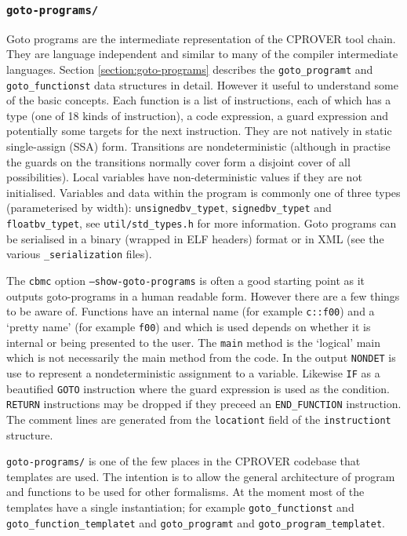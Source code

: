 \documentclass{article}
\newcommand{\dir}[1]{\texttt{#1}}
\newcommand{\file}[1]{\texttt{#1}}
\newcommand{\code}[1]{\texttt{#1}}
\newcommand{\prog}[1]{\texttt{#1}}
\begin{document}
\subsubsection{\dir{goto-programs/}}

Goto programs are the intermediate representation of the CPROVER tool
chain.  They are language independent and similar to many of the
compiler intermediate languages.  Section \ref{section:goto-programs}
describes the \code{goto\_programt} and \code{goto\_functionst} data
structures in detail.  However it useful to understand some of the
basic concepts.  Each function is a list of instructions, each of
which has a type (one of 18 kinds of instruction), a code expression,
a guard expression and potentially some targets for the next
instruction.  They are not natively in static single-assign (SSA)
form.  Transitions are nondeterministic (although in practise the
guards on the transitions normally cover form a disjoint cover of all
possibilities).  Local variables have non-deterministic values if they
are not initialised.  Variables and data within the program is
commonly one of three types (parameterised by width):
\code{unsignedbv\_typet}, \code{signedbv\_typet} and
\code{floatbv\_typet}, see \file{util/std\_types.h} for more
information. Goto programs can be serialised in a binary (wrapped in
ELF headers) format or in XML (see the various \code{\_serialization}
files).


The \prog{cbmc} option \code{--show-goto-programs} is often a
good starting point as it outputs goto-programs in a human
readable form.  However there are a few things to be aware of.
Functions have an internal name (for example \code{c::f00}) and a
`pretty name' (for example \code{f00}) and which is used depends on
whether it is internal or being presented to the user.  The
\code{main} method is the `logical' main which is not necessarily the
main method from the code.  In the output \code{NONDET} is use to
represent a nondeterministic assignment to a variable.  Likewise
\code{IF} as a beautified \code{GOTO} instruction where the guard
expression is used as the condition.  \code{RETURN} instructions may
be dropped if they preceed an \code{END\_FUNCTION} instruction.  The
comment lines are generated from the \code{locationt} field of the
\code{instructiont} structure.

\dir{goto-programs/} is one of the few places in the CPROVER codebase
that templates are used.  The intention is to allow the general
architecture of program and functions to be used for other
formalisms.  At the moment most of the templates have a single
instantiation; for example \code{goto\_functionst} and
\code{goto\_function\_templatet} and \code{goto\_programt} and \code{goto\_program\_templatet}.
\end{document}
